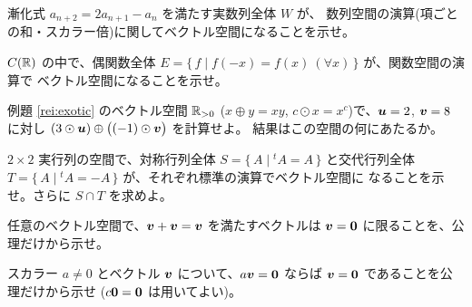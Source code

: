 \begin{mondai}[標準]\label{q:vs-ex6}
漸化式 $a_{n+2} = 2a_{n+1} - a_n$ を満たす実数列全体 $W$ が、
数列空間の演算(項ごとの和・スカラー倍)に関してベクトル空間になることを示せ。
\end{mondai}

\begin{mondai}[標準]\label{q:vs-ex7}
$C(\mathbb{R})$ の中で、偶関数全体
$E = \{\, f \mid f(-x) = f(x)\ (\forall x) \,\}$ が、関数空間の演算で
ベクトル空間になることを示せ。
\end{mondai}

\begin{mondai}[発展]\label{q:vs-ex8}
例題 \ref{rei:exotic} のベクトル空間 $\mathbb{R}_{>0}$
($x \oplus y = xy$, $c \odot x = x^c$)で、$\bm{u} = 2$, $\bm{v} = 8$ に対し
$(3 \odot \bm{u}) \oplus \bigl((-1) \odot \bm{v}\bigr)$ を計算せよ。
結果はこの空間の何にあたるか。
\end{mondai}

\begin{mondai}[発展]\label{q:vs-ex9}
$2 \times 2$ 実行列の空間で、対称行列全体
$S = \{\, A \mid {}^t\!A = A \,\}$ と交代行列全体
$T = \{\, A \mid {}^t\!A = -A \,\}$ が、それぞれ標準の演算でベクトル空間に
なることを示せ。さらに $S \cap T$ を求めよ。
\end{mondai}

\begin{mondai}[証明]\label{q:vs-ex10}
任意のベクトル空間で、$\bm{v} + \bm{v} = \bm{v}$ を満たすベクトルは
$\bm{v} = \bm{0}$ に限ることを、公理だけから示せ。
\end{mondai}

\begin{mondai}[証明]\label{q:vs-ex11}
スカラー $a \ne 0$ とベクトル $\bm{v}$ について、$a\bm{v} = \bm{0}$ ならば
$\bm{v} = \bm{0}$ であることを公理だけから示せ
($c\bm{0} = \bm{0}$ は用いてよい)。
\end{mondai}

